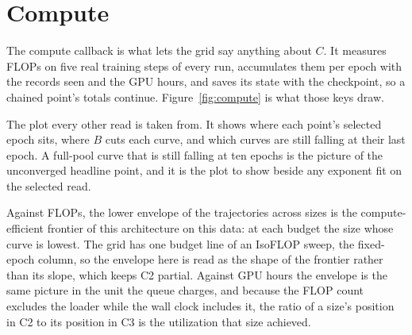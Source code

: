 
\section{Compute}
\label{sec:compute}

The compute callback is what lets the grid say anything about $C$. It measures
FLOPs on five real training steps of every run, accumulates them per epoch with
the records seen and the GPU hours, and saves its state with the checkpoint, so
a chained point's totals continue. Figure~\ref{fig:compute} is what those keys
draw.


The plot every other read is taken from. It shows where each point's selected
epoch sits, where $B$ cuts each curve, and which curves are still falling at
their last epoch. A full-pool curve that is still falling at ten epochs is the
picture of the unconverged headline point, and it is the plot to show beside any
exponent fit on the selected read.

Against FLOPs, the lower envelope of the trajectories across sizes is the
compute-efficient frontier of this architecture on this data: at each budget the
size whose curve is lowest. The grid has one budget line of an IsoFLOP sweep,
the fixed-epoch column, so the envelope here is read as the shape of the
frontier rather than its slope, which keeps C2 partial. Against GPU hours the
envelope is the same picture in the unit the queue charges, and because the FLOP
count excludes the loader while the wall clock includes it, the ratio of a size's
position in C2 to its position in C3 is the utilization that size achieved.

